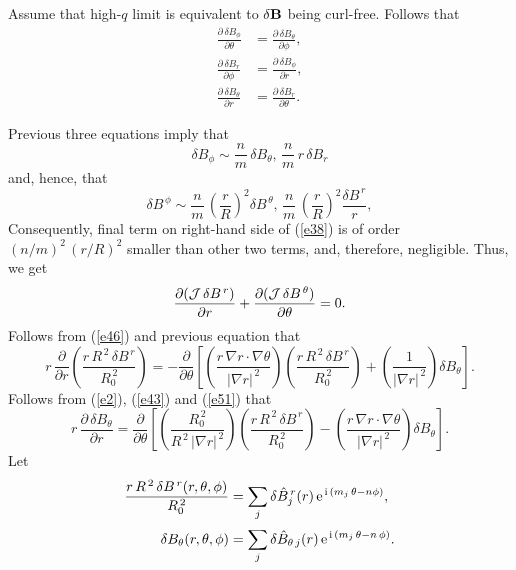 \documentclass[12pt]{article}
\begin{document}
Assume that high-$q$ limit is equivalent to
 $\delta {\bf B}$ being curl-free.
Follows that
\begin{align}
\frac{\partial\,\delta B_\phi}{\partial\theta}&=\frac{\partial \,\delta B_\theta}{\partial\phi},\label{e52}\\[0.5ex]
 \frac{\partial\,\delta B_r}{\partial\phi}&=\frac{\partial \,\delta B_\phi}{\partial r},\\[0.5ex]
 \frac{\partial\,\delta B_\theta}{\partial r}&= \frac{\partial \,\delta B_r}{\partial \theta}.\label{e51}
\end{align}

Previous three equations imply that
\begin{equation}
\delta B_\phi \sim \frac{n}{m}\,\delta B_\theta,\, \frac{n}{m}\,r\,\delta B_r
\end{equation}
and, hence, that 
\begin{equation}
\delta B^{\,\phi} \sim \frac{n}{m}\,\left(\frac{r}{R}\right)^2 \delta B^{\,\theta},\, \frac{n}{m}\,\left(\frac{r}{R}\right)^2 \frac{\delta B^{\,r}}{r}, 
\end{equation}
Consequently,  final term on right-hand side of (\ref{e38}) is of order $(n/m)^2\,(r/R)^2$ smaller than other two terms, and, therefore, negligible. 
Thus, we get 
\begin{equation}
\frac{\partial ({\cal J}\,\delta B^{\,r})}{\partial r}+ \frac{\partial({\cal J}\,\delta B^{\,\theta})}{\partial\theta}  =0.
\end{equation}
Follows from (\ref{e46}) and previous equation that
\begin{equation}
r\,\frac{\partial}{\partial r}\left(\frac{r\,R^{\,2}\,\delta B^{\,r}}{R_0^{\,2}}\right)
=-\frac{\partial}{\partial\theta}\!\left[\left(\frac{r\,\nabla r\cdot\nabla \theta}{|\nabla r|^{\,2}}\right)\left(\frac{r\,R^{\,2}\,\delta B^{\,r}}{R_0^{\,2}}\right) +\left(\frac{1}{|\nabla r|^{\,2}}\right)\delta B_\theta\right].
\end{equation}
Follows from (\ref{e2}), (\ref{e43}) and (\ref{e51}) that
\begin{equation}
r\,\frac{\partial\,\delta B_\theta}{\partial r} =\frac{\partial}{\partial\theta}\!\left[\left(\frac{R_0^{\,2}}{R^{\,2}\,|\nabla r|^{\,2}}\right)\left(\frac{r\,R^{\,2}\,\delta B^{\,r}}{R_0^{\,2}}\right)
-\left(\frac{r\,\nabla r\cdot\nabla\theta}{|\nabla r|^{\,2}}\right)\delta B_\theta\right].
\end{equation}
Let
\begin{align}
\frac{r\,R^{\,2}\,\delta B^{\,r}(r,\theta,\phi)}{R_0^{\,2}}&= \sum_j \delta\hat{B}_j^{\,r}(r)\,{\rm e}^{\,{\rm i}\,(m_j\,\theta-n\phi)},\\[0.5ex]
\delta B_\theta (r,\theta,\phi)&=\sum_j \delta\hat{B}_{\theta\,j}(r)\,{\rm e}^{\,{\rm i}\,(m_j\,\theta-n\,\phi)}.
\end{align}
\end{document}
